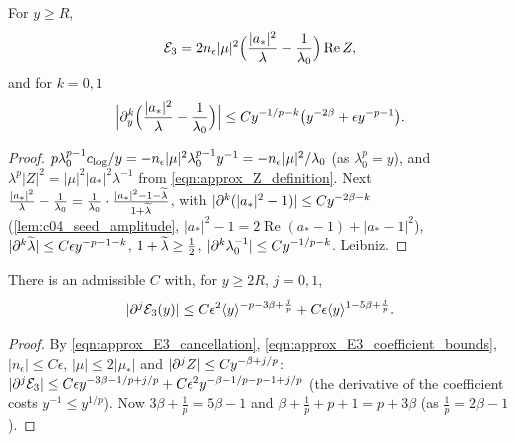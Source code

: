 \begin{lemma}[Cancellation in $\mc E_3$]
  \label{lem:c04_E3_cancellation}
  For $y\ge R$,
  \begin{equation}\label{eqn:approx_E3_cancellation}
    \mathcal{E}_3=2n_\epsilon|\mu|^2\Bigl(\frac{|a_*|^2}\lambda-\frac1{\lambda_0}\Bigr)\operatorname{Re}Z,
  \end{equation}
  and for $k=0,1$
  \begin{equation}\label{eqn:approx_E3_coefficient_bounds}
    \Bigl|\partial^k_y\Bigl(\frac{|a_*|^2}\lambda-\frac1{\lambda_0}\Bigr)\Bigr|\le Cy^{-1/p-k}\bigl(y^{-2\beta}+\epsilon y^{-p-1}\bigr).
  \end{equation}
\end{lemma}
\begin{proof}
  $p\lambda_0^{p-1}c_{\textup{log}}/y=-n_\epsilon|\mu|^2\lambda_0^{p-1}y^{-1}=-n_\epsilon|\mu|^2/\lambda_0$ (as $\lambda_0^p=y$), and
  $\lambda^p|Z|^2=|\mu|^2|a_*|^2\lambda^{-1}$ from \eqref{eqn:approx_Z_definition}. Next
  $\frac{|a_*|^2}\lambda-\frac1{\lambda_0}=\frac1{\lambda_0}\cdot\frac{|a_*|^2-1-\widetilde{\lambda}}{1+\widetilde{\lambda}}$, with $|\partial^k(|a_*|^2-1)|\le Cy^{-2\beta-k}$
  (\cref{lem:c04_seed_amplitude}, $|a_*|^2-1=2\operatorname{Re}(a_*-1)+|a_*-1|^2$), $|\partial^k\widetilde{\lambda}|\le C\epsilon y^{-p-1-k}$, $1+\widetilde{\lambda}\ge\frac12$,
  $|\partial^k\lambda_0^{-1}|\le Cy^{-1/p-k}$. Leibniz.
\end{proof}

\begin{proposition}[Control of $\mc E_3$]
  \label{prop:approx_E3}
  There is an admissible $C$ with, for $y\ge2R$, $j=0,1$,
  \begin{equation}\label{eqn:approx_E3_bound}
    |\partial^j\mathcal{E}_3(y)|\le C\epsilon^2\langle y \rangle^{-p-3\beta+\frac jp}+C\epsilon\langle y \rangle^{1-5\beta+\frac jp}.
  \end{equation}
\end{proposition}
\begin{proof}
  By \eqref{eqn:approx_E3_cancellation}, \eqref{eqn:approx_E3_coefficient_bounds}, $|n_\epsilon|\le C\epsilon$, $|\mu|\le2|\mu_*|$ and $|\partial^jZ|\le Cy^{-\beta+j/p}$:
  $|\partial^j\mathcal{E}_3|\le C\epsilon y^{-3\beta-1/p+j/p}+C\epsilon^2y^{-\beta-1/p-p-1+j/p}$ (the derivative of the coefficient costs $y^{-1}\le y^{1/p}$). Now
  $3\beta+\frac1p=5\beta-1$ and $\beta+\frac1p+p+1=p+3\beta$ (as $\frac1p=2\beta-1$).
\end{proof}

